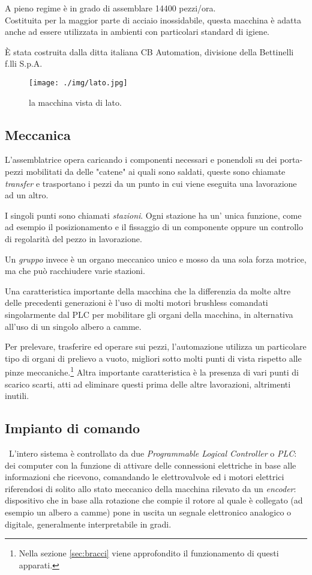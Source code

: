 \documentclass[a4paper,14pt,twoside]{extarticle} %
\begin{document}
A pieno regime è in grado di assemblare 14400 pezzi/ora.\\
Costituita per la maggior parte di acciaio inossidabile, questa macchina è adatta anche ad essere utilizzata in ambienti con particolari standard di igiene.

È stata costruita dalla ditta italiana CB Automation, divisione della Bettinelli f.lli S.p.A.
\begin{figure}[ht!]
\tiny \sf
\centering
\texttt{[image: ./img/lato.jpg]}
\caption{\small \sf la macchina vista di lato.}
\end{figure} 
\subsection{Meccanica}

L'assemblatrice opera caricando i componenti necessari e ponendoli su dei porta-pezzi mobilitati da delle "catene" ai quali sono saldati, queste sono chiamate \emph{transfer} e trasportano i pezzi da un punto in cui viene eseguita una lavorazione ad un altro.

I singoli punti sono chiamati \emph{stazioni}.
Ogni stazione ha un' unica funzione, come ad esempio il posizionamento e il fissaggio di un componente oppure un controllo di regolarità del pezzo in lavorazione.

Un \emph{gruppo} invece è un organo meccanico unico e mosso da una sola forza motrice, ma che può racchiudere varie stazioni.


Una caratteristica importante della macchina che la differenzia da molte altre delle precedenti generazioni è l'uso di molti motori brushless comandati singolarmente dal PLC per mobilitare gli organi della macchina, in alternativa all'uso di un singolo albero a camme.

Per prelevare, trasferire ed operare sui pezzi, l'automazione utilizza un particolare tipo di organi di prelievo a vuoto, migliori sotto molti punti di vista rispetto alle pinze meccaniche.\footnote{Nella sezione \ref{sec:bracci} viene approfondito il funzionamento di questi apparati.}
Altra importante caratteristica è la presenza di vari punti di scarico scarti, atti ad eliminare questi prima delle altre lavorazioni, altrimenti inutili.

\subsection{Impianto di comando}
\
L'intero sistema è controllato da due \emph{Programmable Logical Controller} o \emph{PLC}: dei computer con la funzione di attivare delle connessioni elettriche in base alle informazioni che ricevono, comandando le elettrovalvole ed i motori elettrici riferendosi di solito allo stato meccanico della macchina rilevato da un \emph{encoder}: dispositivo che in base alla rotazione che compie il rotore al quale è collegato (ad esempio un albero a camme) pone in uscita un segnale elettronico analogico o digitale, generalmente interpretabile in gradi.
\end{document}
